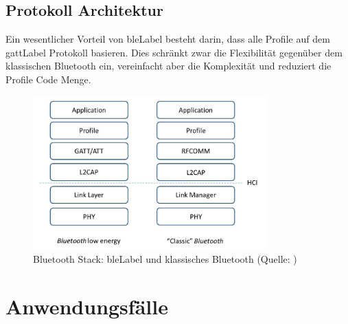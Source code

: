 \subsection{Protokoll Architektur}
Ein wesentlicher Vorteil von \gls{bleLabel} besteht darin, dass alle Profile auf dem \gls{gattLabel} Protokoll basieren.
Dies schränkt zwar die Flexibilität gegenüber dem klassischen Bluetooth ein, vereinfacht aber die Komplexität und reduziert die Profile Code Menge.
\begin{figure}[H]
	\centering
	\includegraphics[width=0.8\textwidth]{images/ble/bluetooth_stack.png}
	\caption[Bluetooth Stack: \gls{bleLabel} und klassisches Bluetooth]{Bluetooth Stack: \gls{bleLabel} und klassisches Bluetooth (Quelle: \cite[][4]{ti_whitepaper_2015-05-08})}
\end{figure}


\section{Anwendungsfälle}






